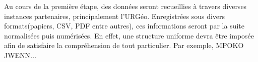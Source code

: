 \par
Au cours de la première étape, des données seront recueillies à 
travers diverses instances partenaires, principalement l'URGéo. 
Enregistrées sous divers formats(papiers, CSV, PDF entre autres), 
ces informations seront par la suite normalisées puis numérisées. En 
effet, une structure uniforme devra être imposée afin de satisfaire la 
compréhension de tout particulier. Par exemple, MPOKO JWENN...